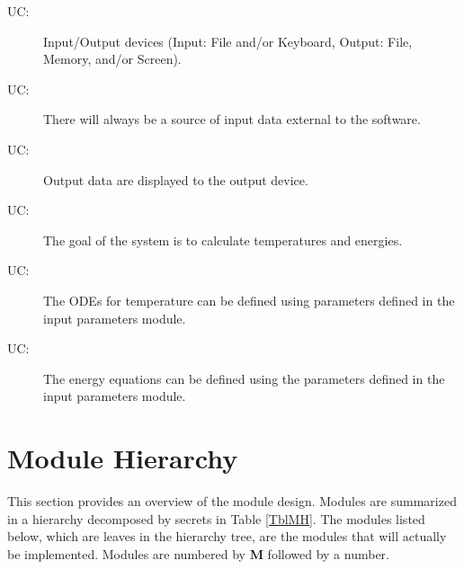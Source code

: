 \documentclass[12pt]{article}
\newcounter{ucnum}
\newcommand{\uctheucnum}{UC\theucnum}
\begin{document}
\begin{description}
\item[ \uctheucnum \label{ucIO}:] Input/Output devices
  (Input: File and/or Keyboard, Output: File, Memory, and/or Screen).
\item[ \uctheucnum \label{ucInput}:] There will always be
  a source of input data external to the software.
\item[ \uctheucnum \label{ucOutput}:] Output data are
  displayed to the output device.
\item[ \uctheucnum \label{ucGoal}:] The goal of the system
  is to calculate temperatures and energies.
\item[ \uctheucnum \label{ucODEstructure}:] The ODEs for
  temperature can be defined using parameters defined in the input parameters module.
\item[ \uctheucnum \label{ucEnergyStructure}:] The energy
  equations can be defined using the parameters defined in the input parameters module.
\end{description}

\section{Module Hierarchy} \label{SecMH}

This section provides an overview of the module design. Modules are summarized
in a hierarchy decomposed by secrets in Table \ref{TblMH}. The modules listed
below, which are leaves in the hierarchy tree, are the modules that will
actually be implemented. Modules are numbered by \textbf{M}
followed by a number. 
\end{document}
